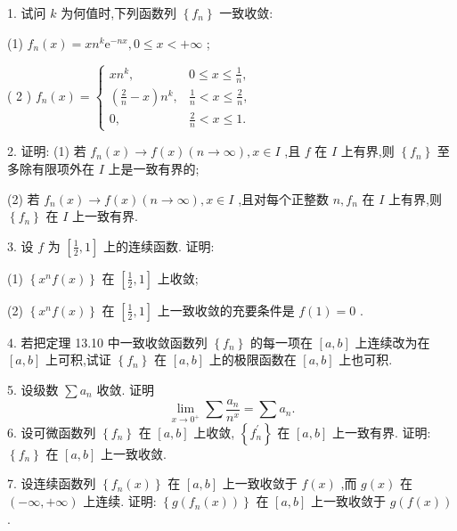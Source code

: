 1. 试问 \(k\) 为何值时,下列函数列 \(\left\{  {f}_{n}\right\}\) 一致收敛:

(1) \({f}_{n}\left( x\right)  = x{n}^{k}{\mathrm{e}}^{-{nx}},0 \leq  x <  + \infty\) ;

( 2 ) \({f}_{n}\left( x\right)  = \left\{  \begin{array}{ll} x{n}^{k}, & 0 \leq  x \leq  \frac{1}{n}, \\  \left( {\frac{2}{n} - x}\right) {n}^{k}, & \frac{1}{n} < x \leq  \frac{2}{n}, \\  0, & \frac{2}{n} < x \leq  1. \end{array}\right.\)

2. 证明: (1) 若 \({f}_{n}\left( x\right)  \rightarrow  f\left( x\right) \left( {n \rightarrow  \infty }\right) ,x \in  I\) ,且 \(f\) 在 \(I\) 上有界,则 \(\left\{  {f}_{n}\right\}\) 至多除有限项外在 \(I\) 上是一致有界的;

(2) 若 \({f}_{n}\left( x\right)  \rightarrow  f\left( x\right) \left( {n \rightarrow  \infty }\right) ,x \in  I\) ,且对每个正整数 \(n,{f}_{n}\) 在 \(I\) 上有界,则 \(\left\{  {f}_{n}\right\}\) 在 \(I\) 上一致有界.

3. 设 \(f\) 为 \(\left\lbrack  {\frac{1}{2},1}\right\rbrack\) 上的连续函数. 证明:

(1) \(\left\{  {{x}^{n}f\left( x\right) }\right\}\) 在 \(\left\lbrack  {\frac{1}{2},1}\right\rbrack\) 上收敛;

(2) \(\left\{  {{x}^{n}f\left( x\right) }\right\}\) 在 \(\left\lbrack  {\frac{1}{2},1}\right\rbrack\) 上一致收敛的充要条件是 \(f\left( 1\right)  = 0\) .

4. 若把定理 13.10 中一致收敛函数列 \(\left\{  {f}_{n}\right\}\) 的每一项在 \(\left\lbrack  {a,b}\right\rbrack\) 上连续改为在 \(\left\lbrack  {a,b}\right\rbrack\) 上可积,试证 \(\left\{  {f}_{n}\right\}\) 在 \(\left\lbrack  {a,b}\right\rbrack\) 上的极限函数在 \(\left\lbrack  {a,b}\right\rbrack\) 上也可积.

5. 设级数 \(\sum {a}_{n}\) 收敛. 证明
\[
\mathop{\lim }\limits_{{x \rightarrow  {0}^{ + }}}\sum \frac{{a}_{n}}{{n}^{x}} = \sum {a}_{n}.
\]
6. 设可微函数列 \(\left\{  {f}_{n}\right\}\) 在 \(\left\lbrack  {a,b}\right\rbrack\) 上收敛, \(\left\{  {f}_{n}^{\prime }\right\}\) 在 \(\left\lbrack  {a,b}\right\rbrack\) 上一致有界. 证明: \(\left\{  {f}_{n}\right\}\) 在 \(\left\lbrack  {a,b}\right\rbrack\) 上一致收敛.

7. 设连续函数列 \(\left\{  {{f}_{n}\left( x\right) }\right\}\) 在 \(\left\lbrack  {a,b}\right\rbrack\) 上一致收敛于 \(f\left( x\right)\) ,而 \(g\left( x\right)\) 在 \(\left( {-\infty , + \infty }\right)\) 上连续. 证明: \(\left\{  {g\left( {{f}_{n}\left( x\right) }\right) }\right\}\) 在 \(\left\lbrack  {a,b}\right\rbrack\) 上一致收敛于 \(g\left( {f\left( x\right) }\right)\) .


